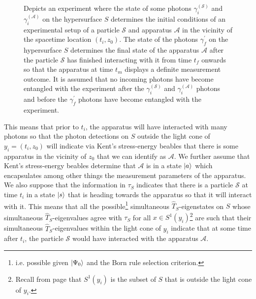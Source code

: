 \begin{figure}[ht!]
	\vspace*{2px}
	\caption{Depicts an experiment where the state of some photons $\gamma_i^{(\mathcal{S})}$ and $\gamma_i^{(\mathcal{A})}$ on the hypersurface $S$ determines the initial conditions of an experimental setup of a particle $\mathcal{S}$ and apparatus $\mathcal{A}$ in the vicinity of the spacetime location $( t_i, z_0)$.  The state of the photons $\gamma_f^{\prime}$ on the hypersurface $S$ determines the final state of the apparatus $\mathcal{A}$ after the particle $ \mathcal{S}$ has finished interacting with it from time $t_f$ onwards so that the apparatus at time $t_m$ displays a definite measurement outcome. It is assumed that no incoming photons have become entangled with the experiment after the $\gamma_i^{(\mathcal{S})}$ and $\gamma_i^{(\mathcal{A})}$ photons and before the $\gamma_f^{\prime}$ photons have become entangled with the experiment.  }
	\label{pisolution}
	\end{figure}
This means that prior to $t_i$, the apparatus will have interacted with many photons so that the photon detections on $S$ outside the light cone of $y_i=(t_i, z_0)$ will indicate via Kent's stress-energy beables that there is some apparatus in the vicinity of $z_0$ that we can identify as $\mathcal{A}$. We further assume that Kent's stress-energy beables determine that $\mathcal{A}$ is in a state $\ket{a}$ which encapsulates among other things the measurement parameters of the apparatus.  We also suppose that the information in $\tau_S$ indicates that there is a particle $\mathcal{S}$ at time $t_i$ in a state
$\ket{s}$ that is heading towards the apparatus so that it will interact with it. This means that all the 
possible\footnote{i.e. possible given $\ket{\Psi_0}$ and the Born rule selection criterion.} 
simultaneous $\hat{T}_S$-eigenstates on $S$ whose simultaneous $\hat{T}_S$-eigenvalues agree with $\tau_S$ for all $x\in S^1(y_i)$\footnote{Recall from page \pageref{S2} that $S^1(y_i)$ is the subset of $S$ that is outside the light cone of $y_i$.} 
 are such that their simultaneous $\hat{T}_S$-eigenvalues within the light cone of $y_i$ indicate that at some time after $t_i$, the particle $\mathcal{S}$ would have interacted
with the apparatus $\mathcal{A}$. 

